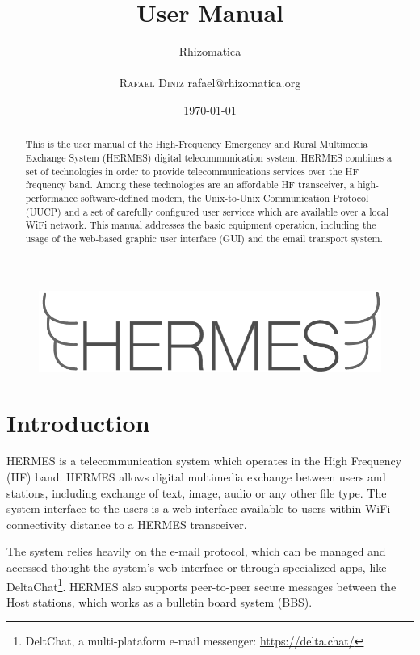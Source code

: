 \documentclass[11pt,a4paper]{article}
\title{User Manual}
\author{
       \large
       \mbox{Rhizomatica} \\
       \mbox{}\\ 
       \textsc{Rafael Diniz}
        rafael@rhizomatica.org\\
}
\date{\today}
\begin{document}
\maketitle

\begin{figure}[!ht]
\includegraphics[width=1\textwidth]{pictures/logoh.png}
\end{figure}

\begin{abstract}

This is the user manual of the High-Frequency Emergency and Rural Multimedia Exchange System (HERMES) digital telecommunication system. HERMES combines a set of technologies in order to provide telecommunications services over the HF frequency band. Among these technologies are an affordable HF transceiver, a high-performance software-defined modem, the Unix-to-Unix Communication Protocol (UUCP) and a set of carefully configured user services which are available over a local WiFi network. This manual addresses the basic equipment operation, including the usage of the web-based graphic user interface (GUI) and the email transport system.

\end{abstract}

\newpage

\tableofcontents

\setlength{\parindent}{0em}
\setlength{\parskip}{1em}

\section{Introduction}

HERMES is a telecommunication system which operates in the High Frequency (HF) band. HERMES allows digital multimedia exchange between users and stations, including exchange of text, image, audio or any other file type. The system interface to the users is a web interface available to users within WiFi connectivity distance to a HERMES transceiver.  

The system relies heavily on the e-mail protocol, which can be managed and accessed thought the system's web interface or through specialized apps, like DeltaChat\footnote{DeltChat, a multi-plataform e-mail messenger: \url{https://delta.chat/} }. HERMES also supports peer-to-peer secure messages between the Host stations, which works as a bulletin board system (BBS).
\end{document}
